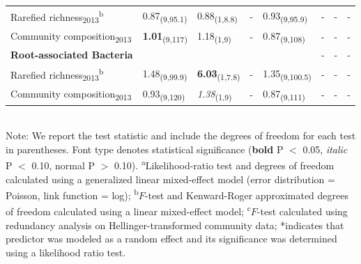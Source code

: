 \documentclass[11pt]{article}
\begin{document}
\begin{table}
\begin{tabular}{llllllll}
Rarefied richness\textsubscript{2013}\textsuperscript{b}     & 0.87\textsubscript{(9,95.1)}  & 0.88\textsubscript{(1,8.8)}  & -               & 0.93\textsubscript{(9,95.9)}  & -             & -              & -             \\
Community composition\textsubscript{2013}  & \textbf{1.01}\textsubscript{(9,117)}   & 1.18\textsubscript{(1,9)}    & -               & 0.87\textsubscript{(9,108)}   & -             & -              & -             \\
\textbf{Root-associated Bacteria}   &               &              &                 &               & -             & -              & -             \\
Rarefied richness\textsubscript{2013}\textsuperscript{b}     & 1.48\textsubscript{(9,99.9)}  & \textbf{6.03}\textsubscript{(1,7.8)} & -               & 1.35\textsubscript{(9,100.5)} & -             & -              & -             \\
Community composition\textsubscript{2013}  & 0.93\textsubscript{(9,120)}   & \textit{1.38}\textsubscript{(1,9)}    & -               & 0.87\textsubscript{(9,111)}   & -             & -              & -  \\
\bottomrule
\end{tabular}
\bigskip{}
\\
{\footnotesize Note: We report the test statistic and include the degrees of freedom
for each test in parentheses. Font type denotes statistical significance
(\textbf{bold} P $<$ 0.05, \textit{italic} P $<$ 0.10, normal P
$>$ 0.10). \textsuperscript{a}Likelihood-ratio test and degrees of freedom calculated using a
generalized linear mixed-effect model (error distribution = Poisson,
link function = log); \textsuperscript{b}$F$-test and Kenward-Roger approximated degrees of
freedom calculated using a linear mixed-effect model; \textsuperscript{c}$F$-test calculated
using redundancy analysis on Hellinger-transformed community data;
*indicates that predictor was modeled as a random effect and its
significance was determined using a likelihood ratio test.}
\end{table}
\end{document}
